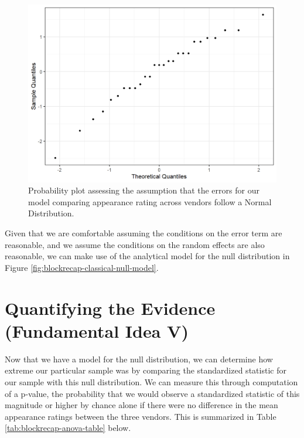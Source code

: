 \documentclass[
]{book}
\theoremstyle{plain}
\theoremstyle{mydefn}
\theoremstyle{myexmpl}
\theoremstyle{remark}
\begin{document}
\begin{figure}

{\centering \includegraphics[width=0.8\linewidth]{./Images/blockrecap-resids-probplot-1} 

}

\caption{Probability plot assessing the assumption that the errors for our model comparing appearance rating across vendors follow a Normal Distribution.}\label{fig:blockrecap-resids-probplot}
\end{figure}

Given that we are comfortable assuming the conditions on the error term are reasonable, and we assume the conditions on the random effects are also reasonable, we can make use of the analytical model for the null distribution in Figure \ref{fig:blockrecap-classical-null-model}.

\hypertarget{quantifying-the-evidence-fundamental-idea-v-2}{%
\section{Quantifying the Evidence (Fundamental Idea V)}\label{quantifying-the-evidence-fundamental-idea-v-2}}

Now that we have a model for the null distribution, we can determine how extreme our particular sample was by comparing the standardized statistic for our sample with this null distribution. We can measure this through computation of a p-value, the probability that we would observe a standardized statistic of this magnitude or higher by chance alone if there were no difference in the mean appearance ratings between the three vendors. This is summarized in Table \ref{tab:blockrecap-anova-table} below.
\end{document}
